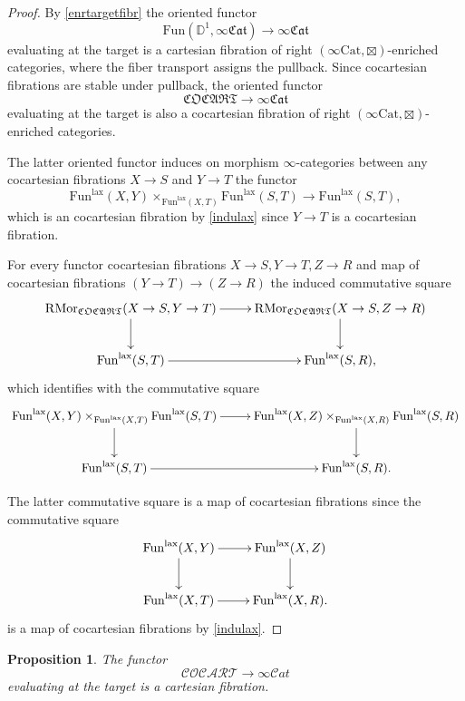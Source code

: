 \documentclass[10pt,oneside]{article}
\numberwithin{equation}{section} %
\numberwithin{figure}{section} %
\theoremstyle{plain}
\newtheorem{proposition}[theorem]{Proposition}
\theoremstyle{definition}
\newcommand{\bD}{{\mathbb D}}
\newcommand{\R}{{\mathrm R}}
\newcommand{\T}{{T}}
\newcommand{\Cat}{\mathrm{Cat}}
\newcommand{\Fun}{\mathrm{Fun}}
\newcommand{\lax}{{\mathrm{lax}}}
\newcommand{\Mor}{{\mathrm{Mor}}}
\newcommand{\scat}{\mathcal{C}\mathit{at}}
\newcommand{\fcat}{\mathfrak{Cat}}
\begin{document}
\begin{proof}

By \cref{enrtargetfibr} the oriented functor $$ \Fun(\bD^1,\infty\fcat) \to \infty\fcat $$
evaluating at the target is a cartesian fibration of right $(\infty\Cat, \boxtimes)$-enriched categories, where the fiber transport assigns the pullback.
Since cocartesian fibrations are stable under pullback, the
oriented functor $$\mathfrak{COCART} \to \infty\fcat $$
evaluating at the target is also a cocartesian fibration of right $(\infty\Cat, \boxtimes)$-enriched categories.

The latter oriented functor induces on morphism $\infty$-categories between any cocartesian fibrations $X \to S$ and $Y \to T$ the functor 
$$ \Fun^\lax(X, Y) \times_{\Fun^\lax(X, T)} \Fun^\lax(S, T) \to \Fun^\lax(S,T), $$
which is an cocartesian fibration by \cref{indulax} since $Y \to T$ is a cocartesian fibration.

For every functor cocartesian fibrations $X \to S, Y \to T, Z \to R$ and
map of cocartesian fibrations $(Y \to T) \to (Z \to R) $ the induced 
commutative square
$$\begin{xy}
\xymatrix{
\R\Mor_{\mathfrak{COCART}}(X \to S, Y \to \T) \ar[d]^{} \ar[r]
& \R\Mor_{\mathfrak{COCART}}(X \to S, Z \to R) \ar[d]
\\ 
\Fun^\lax(S, T) \ar[r] & \Fun^\lax(S, R),}
\end{xy}$$
which identifies with the commutative square
$$\begin{xy}
\xymatrix{
 \Fun^\lax(X, Y) \times_{\Fun^\lax(X, T)} \Fun^\lax(S, T) \ar[d]^{} \ar[r]
& \Fun^\lax(X, Z) \times_{\Fun^\lax(X, R)} \Fun^\lax(S, R) \ar[d]
\\ 
\Fun^\lax(S, T) \ar[r] & \Fun^\lax(S, R).}
\end{xy}$$

The latter commutative square is a map of cocartesian fibrations
since the commutative square 
$$\begin{xy}
\xymatrix{
\Fun^\lax(X, Y) \ar[d]^{} \ar[r]
& \Fun^\lax(X, Z) \ar[d]
\\ 
\Fun^\lax(X, T) \ar[r] & \Fun^\lax(X, R).}
\end{xy}$$
is a map of cocartesian fibrations by \cref{indulax}.
\end{proof}

\begin{proposition}\label{orientfibru0}
The functor $$\mathcal{COCART} \to \infty\scat $$
evaluating at the target is a cartesian fibration.

\end{proposition}
\end{document}
